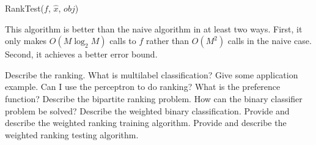 \begin{algorithm}
    \caption{RankTest($f$, $\hat{x}$, $obj$)}
    \label{alg:rank_test}
\end{algorithm}
This algorithm is better than the naive algorithm in at least two ways. First, it only makes \(O(M \log_2 M)\) calls to \(f\) rather than \(O(M^2)\) calls in the naive case. Second, it achieves a better error bound.

\newpage\null
\newpage
\begin{exercise}[topsep=20pt,itemsep=10pt]
    \ex[!] Describe the ranking.
    \ex What is multilabel classification? Give some application example.
    \ex[!] Can I use the perceptron to do ranking?
    \ex What is the preference function?
    \ex Describe the bipartite ranking problem.
    \ex[!] How can the binary classifier problem be solved?
    \ex Describe the weighted binary classification.
    \ex Provide and describe the weighted ranking training algorithm.
    \ex Provide and describe the weighted ranking testing algorithm.
\end{exercise}
